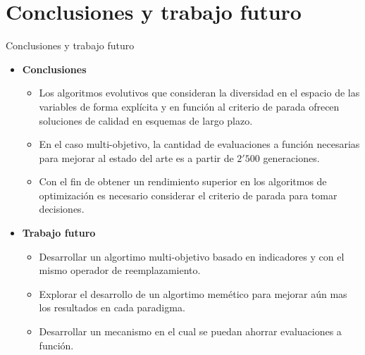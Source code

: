 \documentclass{beamer}
\begin{document}
\section{Conclusiones y trabajo futuro}
\begin{frame}{Conclusiones y trabajo futuro}
  \begin{itemize}  
   \item \textbf{Conclusiones}
      \begin{itemize}
	\scriptsize
        \item Los algoritmos evolutivos que consideran la diversidad en el espacio de las variables de forma explícita y en función al criterio de parada ofrecen soluciones de calidad en esquemas de largo plazo. 
        \item En el caso multi-objetivo, la cantidad de evaluaciones a función necesarias para mejorar al estado del arte es a partir de $2'500$ generaciones.
        \item Con el fin de obtener un rendimiento superior en los algoritmos de optimización es necesario considerar el criterio de parada para tomar decisiones.
    \end{itemize}
 \item \textbf{Trabajo futuro}
  \begin{itemize}
	\scriptsize
	\item Desarrollar un algortimo multi-objetivo basado en indicadores y con el mismo operador de reemplazamiento.
	\item Explorar el desarrollo de un algortimo memético para mejorar aún mas los resultados en cada paradigma.
	\item Desarrollar un mecanismo en el cual se puedan ahorrar evaluaciones a función.
   \end{itemize}
\end{itemize}
\end{frame}




\end{document}
